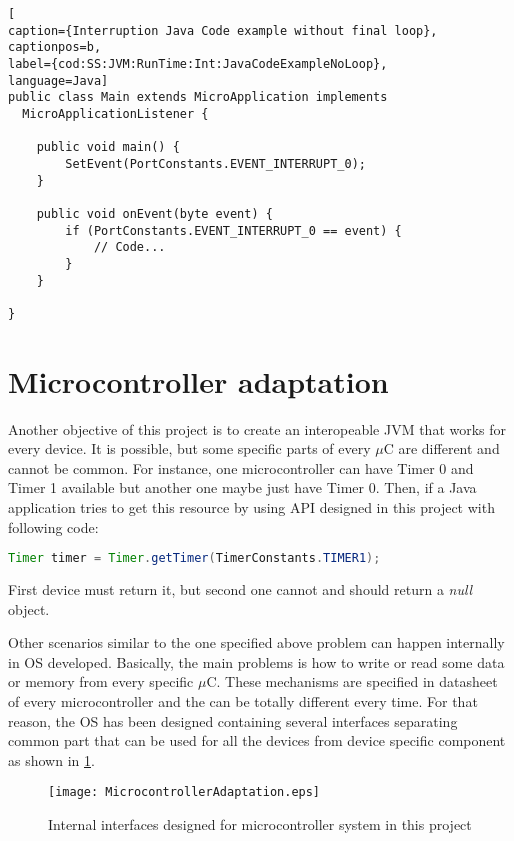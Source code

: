 \medskip
\begin{lstlisting}[
caption={Interruption Java Code example without final loop},
captionpos=b,
label={cod:SS:JVM:RunTime:Int:JavaCodeExampleNoLoop},
language=Java]
public class Main extends MicroApplication implements
  MicroApplicationListener {

    public void main() {
        SetEvent(PortConstants.EVENT_INTERRUPT_0);
    }

    public void onEvent(byte event) {
        if (PortConstants.EVENT_INTERRUPT_0 == event) {
            // Code...
        }
    }

}
\end{lstlisting}
\medskip

\section{Microcontroller adaptation}\label{SS:JVM:Micros}
Another objective of this project is to create an interopeable JVM that works for every device. It is possible, but some specific parts of every $\mu$C are different and cannot be common. For instance, one microcontroller can have Timer 0 and Timer 1 available but another one maybe just have Timer 0. Then, if a Java application tries to get this resource by using API designed in this project with following code:

\medskip
\begin{lstlisting}[language=Java]
Timer timer = Timer.getTimer(TimerConstants.TIMER1);
\end{lstlisting}
\medskip

First device must return it, but second one cannot and should return a \textit{null} object.

Other scenarios similar to the one specified above problem can happen internally in OS developed. Basically, the main problems is how to write or read some data or memory from every specific $\mu$C. These mechanisms are specified in datasheet of every microcontroller and the can be totally different every time. For that reason, the OS has been designed containing several interfaces separating common part that can be used for all the devices from device specific component as shown in \ref{fig:uCIntfs}.

\begin{figure}[H]
\centering
\texttt{[image: MicrocontrollerAdaptation.eps]}
\caption{Internal interfaces designed for microcontroller system in this project}
\label{fig:uCIntfs}
\end{figure}

